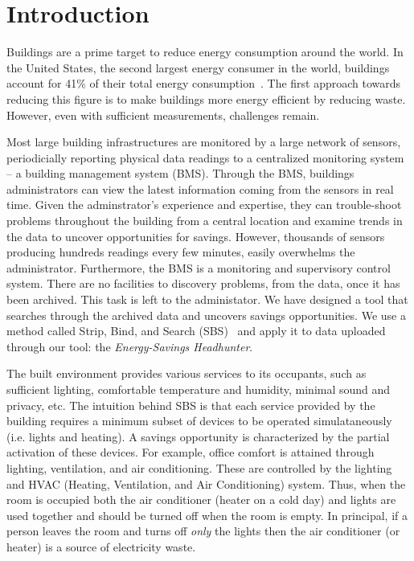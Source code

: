 \section{Introduction}
Buildings are a prime target to reduce energy consumption around the world.
In the United States, the second largest energy consumer in the world, buildings account for 
41\% of their total energy consumption~\cite{aer2011}.
The first approach towards reducing this figure is to make buildings more energy efficient
by reducing waste.  However, even with sufficient measurements, challenges remain.

Most large building infrastructures are monitored by a large network of sensors, periodicially
reporting physical data readings to a centralized monitoring system -- a building management system (BMS).
Through the BMS, buildings administrators can view the latest information coming from the sensors in real time.
Given the adminstrator's experience and expertise, they can trouble-shoot problems throughout the building
from a central location and examine trends in the data to uncover opportunities for savings.
However, thousands of sensors producing hundreds readings every few minutes, easily overwhelms
the administrator.  Furthermore, the BMS is a monitoring and supervisory control system.  There
are no facilities to discovery problems, from the data, once it has been archived.  This task is left to the administator.
We have designed a tool that searches through the archived data and uncovers savings opportunities.  We
use a method called Strip, Bind, and Search (SBS)~\cite{sbs:ipsn2013} and apply it to data uploaded through our tool: 
the \emph{Energy-Savings Headhunter}.

The built environment provides various services to its occupants, such as sufficient 
lighting, comfortable temperature and humidity, minimal sound and privacy, etc.
The intuition behind SBS is that each service provided by the building requires a minimum subset of devices to be operated
simulataneously (i.e. lights and heating).  A savings opportunity is characterized by the partial activation of these devices.
For example, office comfort is attained through lighting, ventilation, and air conditioning.
These are controlled by the lighting and HVAC (Heating, Ventilation, and Air Conditioning) system.
Thus, when the room is occupied both the air conditioner (heater on a cold day) and lights are used together and should be turned off 
when the room is empty.
In principal, if a person leaves the room and turns off \emph{only} the lights then the air conditioner (or heater) is a source of electricity waste.

